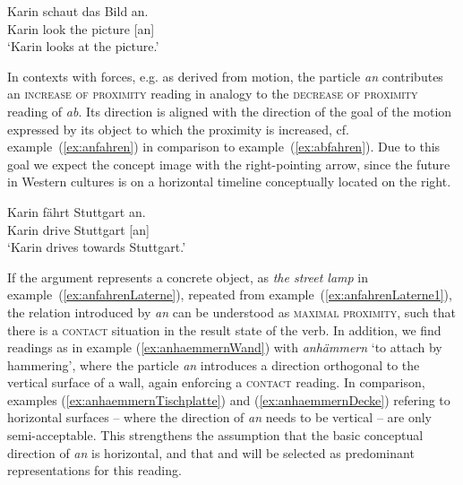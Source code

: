 \documentclass[output=paper]{langsci/langscibook}
\begin{document}
\ea\label{ex:anschauen}
\gll Karin schaut das Bild an.\\
Karin look the picture [an]\\
\glt `Karin looks at the picture.'
\z

In contexts with forces, e.g. as derived from motion, the particle
\textit{an} contributes an \textsc{increase of proximity} reading in
analogy to the \textsc{decrease of proximity} reading of
\textit{ab}. Its direction is aligned with the direction of the goal
of the motion expressed by its object to which the proximity is
increased, cf. example~(\ref{ex:anfahren}) in comparison to
example~(\ref{ex:abfahren}). Due to this goal we expect the concept image
 with the right-pointing arrow, since the future in
Western cultures is on a horizontal timeline conceptually located on
the right.

\ea\label{ex:anfahren}
\gll Karin fährt Stuttgart an.\\
Karin drive Stuttgart [an]\\
\glt `Karin drives towards Stuttgart.'
\z

If the argument represents a concrete object, as \textit{the street lamp}
in example~(\ref{ex:anfahrenLaterne}), repeated from
example~(\ref{ex:anfahrenLaterne1}), the relation introduced by
\textit{an} can be understood as \textsc{maximal proximity}, such that
there is a \textsc{contact} situation in the result state of the
verb. In addition, we find readings as in example
(\ref{ex:anhaemmernWand}) with \textit{anhämmern} `to attach by
hammering', where the particle \textit{an} introduces a direction
orthogonal to the vertical surface of a wall, again enforcing a
\textsc{contact} reading. In comparison, examples
(\ref{ex:anhaemmernTischplatte}) and (\ref{ex:anhaemmernDecke})
refering to horizontal surfaces -- where the direction of \textit{an}
needs to be vertical -- are only semi-acceptable. This strengthens the
assumption that the basic conceptual direction of \textit{an} is
horizontal, and that  and  will
be selected as predominant representations for this reading.

\z
\end{document}
